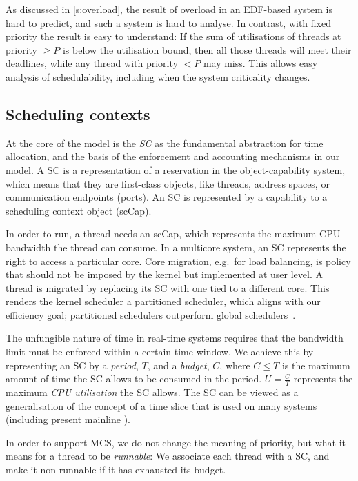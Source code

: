 As discussed in \autoref{s:overload}, the result of overload in an
EDF-based system is hard to predict, and such a system is hard to
analyse. In contrast, with fixed priority the result is easy to
understand: If the sum of utilisations of threads at priority \(\geq
P\) is below the utilisation bound, then all those threads will meet
their deadlines, while any thread with priority \(<P\) may miss. This
allows easy analysis of schedulability, including when the system
criticality changes.

\subsection{Scheduling contexts}
\label{s:scs}

At the core of the model is the \emph{\gls{SC}} as the
fundamental abstraction for time allocation, and the basis of 
the enforcement and accounting mechanisms in our model.
A \gls{SC} is a representation
of a reservation in the object-capability system, which means that 
they are first-class objects, like threads, address spaces, or
communication endpoints (ports). An SC is represented by a capability to a
scheduling context object (scCap).

In order to run, a thread needs an scCap, which represents the
maximum CPU bandwidth the thread can consume.
In a multicore system, an SC represents the right to access a
particular core. Core migration, e.g.\ for load balancing, is policy
that should not be imposed by the kernel but implemented at user
level. A thread is migrated by replacing its SC with one tied to a
different core. This renders the kernel scheduler a partitioned scheduler, 
which aligns with our efficiency goal; partitioned schedulers outperform global
schedulers~\citep{Brandenburg:phd}.

The unfungible nature of time in real-time systems requires that the
bandwidth limit must be enforced within a certain time window. We
achieve this by representing an SC by a \emph{period}, \(T\), and a
\emph{budget}, \(C\), where \(C\leq T\) is the maximum amount of time
the SC allows to be consumed in the period. \(U=\frac{C}{T}\) represents the
maximum \emph{CPU utilisation} the SC allows. The SC can be viewed as
a generalisation of the concept of a time slice that is used on many
systems (including present mainline \selfour).

In order to support MCS, we do not
change the meaning of priority, but what it means for a thread to be
\emph{runnable}: We associate each thread with a SC, and
make it non-runnable if it has exhausted its budget. 


